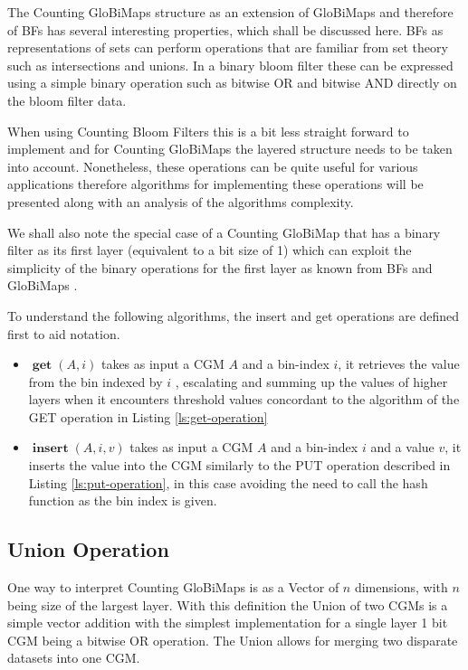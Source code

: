 \documentclass[sigconf]{acmart}
\DeclareMathOperator{\get}{\textbf{get}}
\DeclareMathOperator{\insertv}{\textbf{insert}}
\begin{document}
The Counting GloBiMaps structure as an extension of GloBiMaps and
therefore of BFs has several interesting properties, which
shall be discussed here. BFs as representations of sets can
perform operations that are familiar from set theory such as
intersections and unions. In a binary bloom filter these can be
expressed using a simple binary operation such as bitwise OR and bitwise
AND directly on the bloom filter data.

When using Counting Bloom Filters this is a bit less straight forward to
implement and for Counting GloBiMaps the layered structure needs to be
taken into account. Nonetheless, these operations can be quite useful for
various applications therefore algorithms for implementing these
operations will be presented along with an analysis of the algorithms
complexity.

We shall also note the special case of a Counting GloBiMap that has a binary filter as its first layer (equivalent to a bit size of 1) which can exploit the simplicity of the binary operations for the first layer as known from BFs and GloBiMaps \cite{werner2019globimaps}.

To understand the following algorithms, the insert and get operations are defined first to aid notation.

\begin{itemize}
  \item{
        $\get(A, i)$ takes as input a CGM $A$ and a bin-index $i$, it retrieves the value from the bin indexed by $i$ , escalating and summing up the values of higher layers when it encounters threshold values concordant to the algorithm of the GET operation in Listing \ref{ls:get-operation} }
  \item{
        $\insertv(A, i, v)$ takes as input a CGM $A$ and a bin-index $i$ and a value $v$, it inserts the value into the CGM similarly to the PUT operation described in Listing \ref{ls:put-operation}, in this case avoiding the need to call the hash function as the bin index is given.}
\end{itemize}

\subsection{Union Operation}\label{union-operation}

One way to interpret Counting GloBiMaps is as a Vector of $n$
dimensions, with $n$ being size of the largest layer. With this
definition the Union of two CGMs is a simple vector addition with the
simplest implementation for a single layer 1 bit CGM being a bitwise OR
operation. The Union allows for merging two disparate datasets into one CGM.
\end{document}
